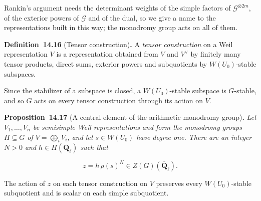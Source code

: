 \documentclass[11pt]{article}
\newenvironment{bpstatement}[2]{\par\addvspace{0.6\baselineskip}\noindent\textbf{#1}#2\textbf{.}\enspace\ignorespaces}
  {\par\addvspace{0.4\baselineskip}}
\newenvironment{bpstatementit}[2]{\begin{bpstatement}{#1}{#2}\itshape\ignorespaces}{\end{bpstatement}}
\begin{document}
\label{bp51}%
Rankin's argument needs the determinant weights of the simple factors of \(\mathcal G^{\otimes2m}\), of the exterior powers of \(\mathcal G\) and of the dual, so we give a name to the representations built in this way; the monodromy group acts on all of them.

\label{bp52}%
\begin{bpstatement}{Definition~14.16}{ (Tensor construction)}
A \emph{tensor construction} on a Weil representation \(V\) is a representation obtained from \(V\) and \(V^\vee\) by finitely many tensor products, direct sums, exterior powers and subquotients by \(W(U_0)\)-stable subspaces.
\end{bpstatement}

\label{bp53}%
Since the stabilizer of a subspace is closed, a \(W(U_0)\)-stable subspace is \(G\)-stable, and so \(G\) acts on every tensor construction through its action on \(V\).

\label{bp54}%
\begin{bpstatementit}{Proposition~14.17}{ (A central element of the arithmetic monodromy group)}
Let \(V_1,\ldots,V_n\) be semisimple Weil representations and form the monodromy groups \(H\subseteq G\) of \(V=\bigoplus_iV_i\), and let \(s\in W(U_0)\) have degree one. There are an integer \(N>0\) and \(h\in H(\overline{\mathbf Q}_\ell)\) such that

\[
z=h\,\rho(s)^N\in Z(G)(\overline{\mathbf Q}_\ell).
\]

The action of \(z\) on each tensor construction on \(V\) preserves every \(W(U_0)\)-stable subquotient and is scalar on each simple subquotient.
\end{bpstatementit}
\end{document}

